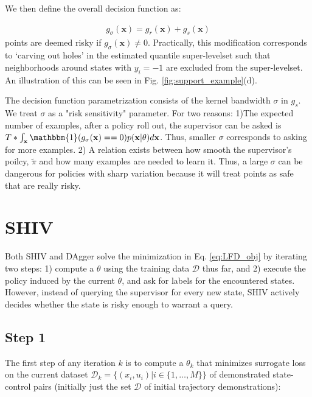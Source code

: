 \documentclass[10pt, conference]{ieeeconf}      %
\newcommand{\bx}{\mathbf{x}}
\begin{document}
We then define the overall decision function as:

\vspace{-2ex}
\begin{align}\label{eq:decision_func}
g_{\sigma}(\bx) = g_{r} (\bx)+ g_{s}(\bx)
\end{align}
points are deemed risky if $g_{\sigma}(\bx) \neq 0$.  Practically, this modification corresponds to
`carving out holes' in the estimated quantile super-levelset such that neighborhoods around states with $y_i=-1$ are
excluded from the super-levelset. An illustration of this can be seen in Fig. \ref{fig:support_example}(d).




The decision function parametrization consists of the kernel bandwidth $\sigma$ in $g_s$. We treat $\sigma$ as a "risk sensitivity" parameter. For two reasons: 1)The expected number of examples, after a policy roll out, the supervisor can be asked is  $T*\int_\bx \mathbbm{1}(g_{\sigma}(\bx) == 0) p(\bx|\theta)d\bx$. Thus, smaller $\sigma$ corresponds to asking for more examples. 2) A relation exists between how smooth the supervisor's poilcy, $\tilde{\pi}$ and how many examples are needed to learn it. Thus, a large $\sigma$ can be dangerous for policies with sharp variation because it will treat points as safe that are really risky. 

\section{SHIV} \label{sec:SHIV}

Both SHIV and DAgger \cite{ross2010reduction} solve the minimization in Eq. \ref{eq:LFD_obj} by iterating two steps: 1) compute a $\theta$ using the training data $\mathcal{D}$ thus far, and 2) execute the policy induced by the current $\theta$, and ask for labels for the encountered states. However, instead of querying the supervisor for every new state, SHIV actively decides whether the state is risky enough to warrant a query. 


\subsection{Step 1}
The first step of any iteration $k$ is to compute a $\theta_k$ that minimizes surrogate loss on the current dataset $\mathcal{D}_k=\{(x_i,u_i)|i\in\{1,\ldots,M\}\}$ of demonstrated state-control pairs (initially just the set $\mathcal{D}$ of initial trajectory demonstrations):
\end{document}
